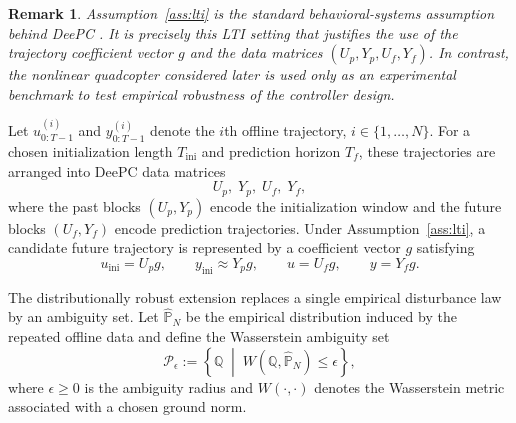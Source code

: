 \documentclass[conference]{IEEEtran}
\newtheorem{remark}{Remark}
\begin{document}
\begin{remark}
Assumption~\ref{ass:lti} is the standard behavioral-systems assumption behind DeePC \cite{Coulson2019DeePC}. It is precisely this LTI setting that justifies the use of the trajectory coefficient vector $g$ and the data matrices $(U_p,Y_p,U_f,Y_f)$. In contrast, the nonlinear quadcopter considered later is used only as an experimental benchmark to test empirical robustness of the controller design.
\end{remark}

Let $u^{(i)}_{0:T-1}$ and $y^{(i)}_{0:T-1}$ denote the $i$th offline trajectory, $i \in \{1,\dots,N\}$. For a chosen initialization length $T_{\mathrm{ini}}$ and prediction horizon $T_f$, these trajectories are arranged into DeePC data matrices
\begin{equation}
U_p,\; Y_p,\; U_f,\; Y_f,
\end{equation}
where the past blocks $(U_p,Y_p)$ encode the initialization window and the future blocks $(U_f,Y_f)$ encode prediction trajectories. Under Assumption~\ref{ass:lti}, a candidate future trajectory is represented by a coefficient vector $g$ satisfying
\begin{equation}
u_{\mathrm{ini}} = U_p g,\qquad y_{\mathrm{ini}} \approx Y_p g,\qquad
u = U_f g,\qquad y = Y_f g.
\end{equation}

The distributionally robust extension replaces a single empirical disturbance law by an ambiguity set. Let $\hat{\mathbb{P}}_N$ be the empirical distribution induced by the repeated offline data and define the Wasserstein ambiguity set
\begin{equation}
\mathcal{P}_{\epsilon}
:=
\left\{
\mathbb{Q}\; \middle| \;
W(\mathbb{Q},\hat{\mathbb{P}}_N)\le \epsilon
\right\},
\end{equation}
where $\epsilon \ge 0$ is the ambiguity radius and $W(\cdot,\cdot)$ denotes the Wasserstein metric associated with a chosen ground norm.
\end{document}

